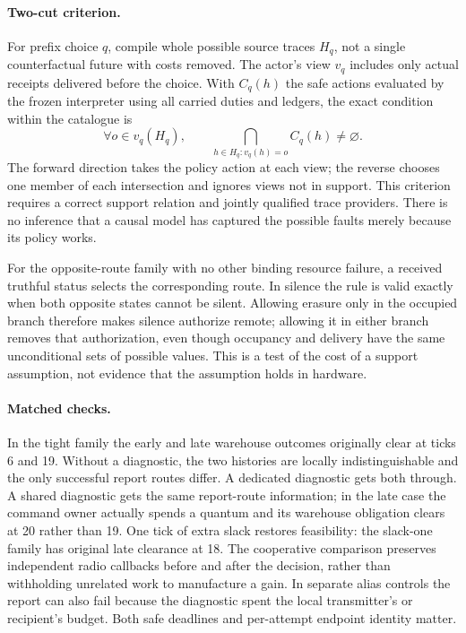\documentclass[11pt]{article}
\begin{document}
\paragraph{Two-cut criterion.}
For prefix choice $q$, compile whole possible source traces $H_q$, not
a single counterfactual future with costs removed. The actor's view
$v_q$ includes only actual receipts delivered before the choice. With
$C_q(h)$ the safe actions evaluated by the frozen interpreter using all
carried duties and ledgers, the exact condition within the catalogue is
\[
  \forall o\in v_q(H_q),\qquad
  \bigcap_{h\in H_q:v_q(h)=o} C_q(h)\ne\varnothing.
\]
The forward direction takes the policy action at each view; the reverse
chooses one member of each intersection and ignores views not in
support. This criterion requires a correct support relation and jointly
qualified trace providers. There is no inference that a causal model
has captured the possible faults merely because its policy works.

For the opposite-route family with no other binding resource failure,
a received truthful status selects the corresponding route. In silence
the rule is valid exactly when both opposite states cannot be silent.
Allowing erasure only in the occupied branch therefore makes silence
authorize remote; allowing it in either branch removes that
authorization, even though occupancy and delivery have the same
unconditional sets of possible values. This is a test of the cost of a
support assumption, not evidence that the assumption holds in hardware.

\paragraph{Matched checks.}
In the tight family the early and late warehouse outcomes originally
clear at ticks 6 and 19. Without a diagnostic, the two histories are
locally indistinguishable and the only successful report routes differ.
A dedicated diagnostic gets both through. A shared diagnostic gets the
same report-route information; in the late case the command owner
actually spends a quantum and its warehouse obligation clears at 20
rather than 19. One tick of extra slack restores feasibility: the
slack-one family has original late clearance at 18. The cooperative
comparison preserves independent radio callbacks before and after the
decision, rather than withholding unrelated work to manufacture a gain. In separate alias
controls the report can also fail because the diagnostic spent the
local transmitter's or recipient's budget. Both safe deadlines and
per-attempt endpoint identity matter.
\end{document}

